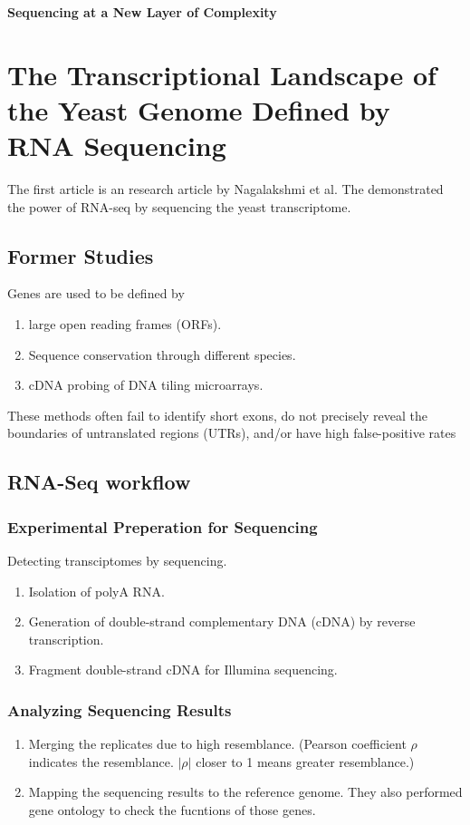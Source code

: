 \documentclass[a4paper,12pt]{article}
\begin{document}
\textbf{\centering \Large{Sequencing at a New Layer of Complexity}}


\raggedright
\section{\large{The Transcriptional Landscape of the Yeast Genome Defined by RNA Sequencing}}

The first article is an research article by Nagalakshmi et al. The demonstrated the power of RNA-seq by sequencing the yeast transcriptome.
	
	\subsection{Former Studies}
	Genes are used to be defined by
	\begin{enumerate}
		\item large open reading frames (ORFs).
		\item Sequence conservation through different species.
		\item cDNA probing of DNA tiling microarrays.
	\end{enumerate}
	
	 These methods often fail to identify short exons, do not precisely reveal the boundaries of untranslated regions (UTRs), and/or have high false-positive rates
	
	\subsection{RNA-Seq workflow}
	\subsubsection{Experimental Preperation for Sequencing}
	Detecting transciptomes by sequencing.
	\begin{enumerate}
		\item Isolation of polyA RNA.
		\item Generation of double-strand complementary DNA (cDNA) by reverse transcription.
		\item Fragment double-strand cDNA for Illumina sequencing. 
	\end{enumerate}
	
	\subsubsection{Analyzing Sequencing Results}
	\begin{enumerate}
		\item Merging the replicates due to high resemblance. (Pearson coefficient $\rho$ indicates the resemblance. $|\rho|$ closer to 1 means greater resemblance.)
		\item Mapping the sequencing results to the reference genome. They also performed gene ontology to check the fucntions of those genes.
	\end{enumerate}
	
\end{document}
